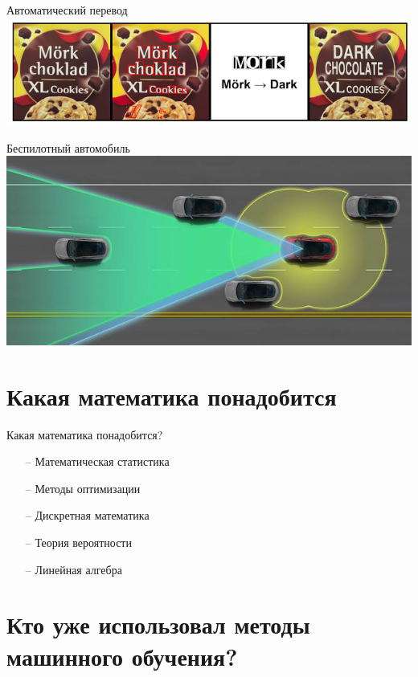 \documentclass[10pt]{beamer}
\begin{document}
{
\begin{frame}{Автоматический перевод}
  \centering
  \includegraphics[width=0.9 \linewidth, height=0.9 \textheight, keepaspectratio]{images/translation}\\
\end{frame}
}

{
\begin{frame}{Беспилотный автомобиль}
  \centering
  \includegraphics[width=0.9 \linewidth, height=0.9 \textheight, keepaspectratio]{images/self_driving}\\
\end{frame}
}

\section{Какая математика понадобится}

\begin{frame}{Какая математика понадобится?}
	\begin{itemize} [<+->]
	  \item[--] Математическая статистика 
	  \item[--] Методы оптимизации 
	  \item[--] Дискретная математика
	  \item[--] Теория вероятности
	  \item[--] Линейная алгебра
	\end{itemize}
\end{frame}

\section{Кто уже использовал методы машинного обучения? }
\end{document}
